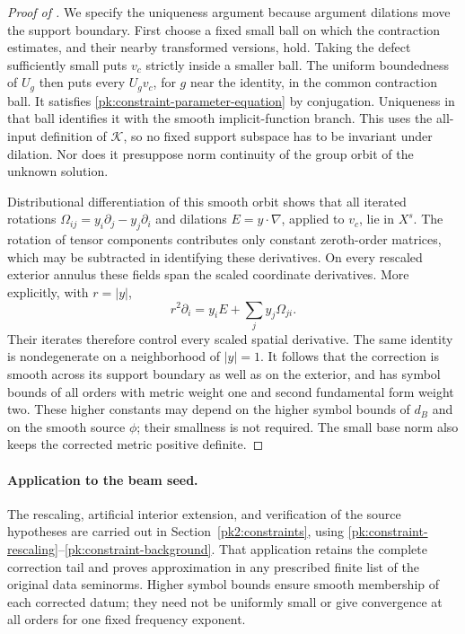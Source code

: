 \begin{proof}[Proof of ]
We specify the uniqueness argument because argument dilations move
the support boundary.  First choose a fixed small ball on which
the contraction estimates, and their nearby transformed versions,
hold.  Taking the defect sufficiently small puts \(v_c\) strictly
inside a smaller ball.  The uniform boundedness of \(U_g\) then puts
every \(U_gv_c\), for \(g\) near the identity, in the common contraction
ball.  It satisfies \eqref{pk:constraint-parameter-equation} by
conjugation.  Uniqueness in that ball identifies it with the smooth
implicit-function branch.  This uses the all-input definition of
\(\mathcal K\), so no fixed support subspace has to be invariant
under dilation.  Nor does it presuppose norm continuity of the
group orbit of the unknown solution.

Distributional differentiation of this smooth orbit shows that all
iterated rotations
\(\Omega_{ij}=y_i\partial_j-y_j\partial_i\) and dilations
\(E=y\cdot\nabla\), applied to \(v_c\), lie in \(X^s\).
The rotation of tensor components contributes only constant
zeroth-order matrices, which may be subtracted in identifying these
derivatives.
On every rescaled exterior annulus these fields span the scaled
coordinate derivatives.  More explicitly, with \(r=|y|\),
\[
 r^2\partial_i=y_iE+\sum_j y_j\Omega_{ji}.
\]
Their iterates therefore control every scaled spatial derivative.
The same identity is nondegenerate on a neighborhood of \(|y|=1\).
It follows that the correction is smooth across its support
boundary as well as on the exterior, and has symbol bounds of all
orders with metric weight one and second fundamental form weight two.
These higher constants may depend on the higher symbol bounds of
$d_B$ and on the smooth source $\phi$; their smallness is not required.
The small base norm also keeps the corrected metric positive definite.
\end{proof}

\paragraph{Application to the beam seed.}
The rescaling, artificial interior extension, and verification of the
source hypotheses are carried out in Section~\ref{pk2:constraints},
using \eqref{pk:constraint-rescaling}--\eqref{pk:constraint-background}.
That application retains the complete correction tail and proves
approximation in any prescribed finite list of the original data
seminorms. Higher symbol bounds ensure smooth membership of each
corrected datum; they need not be uniformly small or give convergence
at all orders for one fixed frequency exponent.
